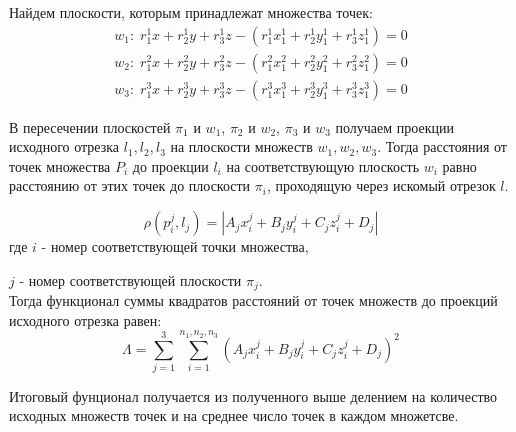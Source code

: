 Найдем плоскости, которым принадлежат множества точек:
$$\begin{gathered}
	w_1: \; r_1^1 x + r_2^1 y + r_3^1 z - (r_1^1 x_1^1 + r_2^1 y_1^1 + r_3^1 z_1^1) = 0 \\
	w_2: \; r_1^2 x + r_2^2 y + r_3^2 z - (r_1^2 x_1^2 + r_2^2 y_1^2 + r_3^2 z_1^2) = 0 \\
	w_3: \; r_1^3 x + r_2^3 y + r_3^3 z - (r_1^3 x_1^3 + r_2^3 y_1^3 + r_3^3 z_1^3) = 0
\end{gathered}$$

В пересечении плоскостей $\pi_1$ и $w_1$, $\pi_2$ и $w_2$, $\pi_3$ и $w_3$ получаем проекции исходного отрезка $l_1, l_2, l_3$ на плоскости множеств $w_1, w_2, w_3$. Тогда расстояния от точек множества $P_i$ до проекции $l_i$ на соответствующую плоскость $w_i$ равно расстоянию от этих точек до плоскости $\pi_i$, проходящую через искомый отрезок $l$.

$$\rho (p_i^j, l_j) = |A_j x_i^j + B_j y_i^j + C_j z_i^j + D_j|$$
где $i$ - номер соответствующей точки множества,

$j$ - номер соответствующей плоскости $\pi_j$.\\
Тогда функционал суммы квадратов расстояний от точек множеств до проекций исходного отрезка равен:
$$\Lambda = \underset{j=1}{\overset{3}{\sum}}\underset{i=1}{\overset{n_1, n_2, n_3}{\sum}}(A_j x_i^j + B_j y_i^j + C_j z_i^j + D_j)^2$$

Итоговый фунционал получается из полученного выше делением на количество исходных множеств точек и на среднее число точек в каждом множетсве.






































